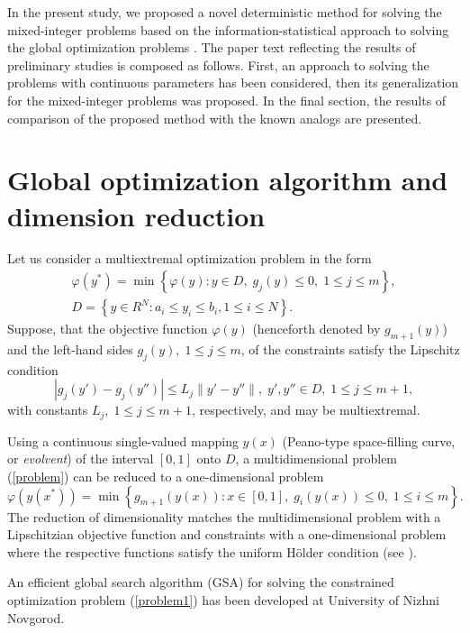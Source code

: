 \documentclass{llncs}
\begin{document}
In the present study, we proposed a novel deterministic method for solving the mixed-integer 
problems based on the information-statistical approach to solving the global optimization 
problems \cite{Strongin2000,Strongin2013}. The paper text reflecting the results of preliminary 
studies is composed as follows. First, an approach to solving the problems with continuous 
parameters has been considered, then its generalization for the mixed-integer problems was 
proposed. In the final section, the results of comparison of the proposed method with the 
known analogs are presented.

\section{Global optimization algorithm and dimension reduction}

Let us consider a multiextremal optimization problem in the form
\begin{gather}\label{problem}
\varphi(y^\ast)=\min{\left\{\varphi(y):y\in D, \; g_j(y)\leq 0, \; 1 \leq j \leq m\right\}},\\
D=\left\{y\in R^N: a_i\leq y_i \leq b_i, 1\leq i \leq N\right\}.\nonumber
\end{gather}
Suppose, that the objective function $\varphi(y)$ (henceforth denoted by $g_{m+1}(y)$) and
the left-hand sides $g_j(y), \; 1\leq j \leq m$, of the constraints satisfy the Lipschitz condition
\[ \left|g_j(y')-g_j(y'')\right| \leq L_j \left\|y'-y'' \right\|, \; y',y''\in D, \; 1\leq j \leq m+1, \]
with constants $L_j, \; 1 \leq j \leq m+1$, respectively,  
and may be multiextremal.

Using a continuous single-valued mapping $y(x)$  (Peano-type space-filling curve, or \textit{evolvent}) of the interval $[0,1]$ onto $D$, a multidimensional problem (\ref{problem}) can be reduced to a one-dimensional problem
\begin{equation}\label{problem1}
\varphi(y(x^\ast))= \min \left\{g_{m+1}(y(x)): x \in [0,1], \; g_i(y(x))\leq 0, \; 1 \leq i \leq m\right\}.
\end{equation}
The reduction of dimensionality matches the multidimensional problem with a Lipschitzian objective function and constraints with a one-dimensional problem where the respective functions satisfy the uniform H\"older condition (see \cite{Strongin2000}).

An efficient global search algorithm (GSA) for solving the constrained optimization problem 
(\ref{problem1}) has been developed at University of Nizhni Novgorod. 
\end{document}
